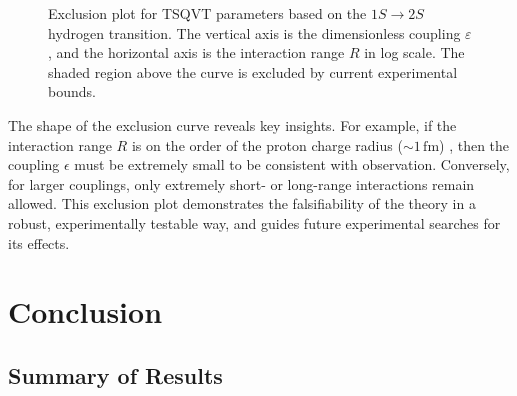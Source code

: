 \documentclass[a4paper]{article}
\begin{document}
	\begin{figure}[H]
		\centering
		\caption{Exclusion plot for TSQVT parameters based on the $1S\to2S$ hydrogen transition. 
			The vertical axis is the dimensionless coupling $\varepsilon$, and the horizontal 
			axis is the interaction range $R$ in log scale. The shaded region above the curve 
			is excluded by current experimental bounds.}
		\label{fig:exclusion}
	\end{figure}
	




The shape of the exclusion curve reveals key insights. For example, if the interaction range $R$ is on the order of the proton charge radius ($\sim 1\,\mathrm{fm}$) \cite{Pohl2010, Gao2022}, then the coupling $\epsilon$ must be extremely small to be consistent with observation. Conversely, for larger couplings, only extremely short- or long-range interactions remain allowed. This exclusion plot demonstrates the falsifiability of the theory in a robust, experimentally testable way, and guides future experimental searches for its effects.


\section{Conclusion}

\subsection{Summary of Results}
\end{document}
